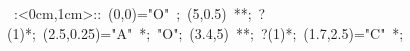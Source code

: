 
\hbox{
\xy    <1cm,0cm>:<0cm,1cm>::
       (0,0)="O" ; (5,0.5) **\dir{-};  ?(1)*\dir{>}; (2.5,0.25)="A" *{\bullet};
       "O"; (3.4,5) **\dir{-};  ?(1)*\dir{>}; (1.7,2.5)="C" *{\bullet};
       \endxy}
	   
